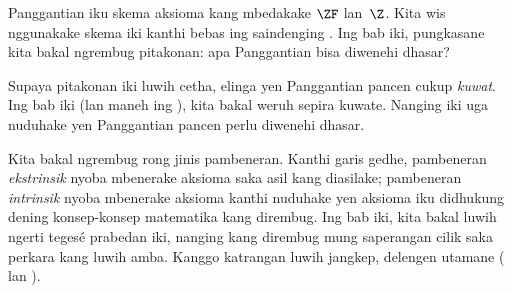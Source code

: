 \documentclass[../../../include/open-logic-section]{subfiles}
\begin{document}

Panggantian iku skema aksioma kang mbedakake
$\ZF$ lan~$\Z$. Kita wis nggunakake skema iki
kanthi bebas ing saindenging
.
Ing bab iki, pungkasane kita bakal ngrembug
pitakonan: apa Panggantian bisa diwenehi dhasar?

Supaya pitakonan iki luwih cetha, elinga yen
Panggantian pancen cukup \emph{kuwat}. Ing bab
iki (lan maneh ing
),
kita bakal weruh sepira kuwate. Nanging iki
uga nuduhake yen Panggantian pancen perlu
diwenehi dhasar.

Kita bakal ngrembug rong jinis pambeneran. Kanthi
garis gedhe, pambeneran \emph{ekstrinsik} nyoba
mbenerake aksioma saka asil kang diasilake;
pambeneran \emph{intrinsik} nyoba mbenerake
aksioma kanthi nuduhake yen aksioma iku didhukung
dening konsep-konsep matematika kang dirembug.
Ing bab iki, kita bakal luwih ngerti tegesé
prabedan iki, nanging kang dirembug mung
saperangan cilik saka perkara kang luwih amba.
Kanggo katrangan luwih jangkep, delengen utamane
\citeauthor{Maddy1988a} (\citeyear{Maddy1988a}
lan \citeyear{Maddy1988b}).
\end{document}
